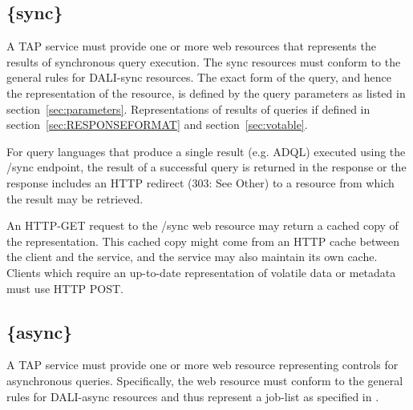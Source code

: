 \documentclass[11pt,letter]{ivoa}
\begin{document}
\subsection{\{sync\}}
\label{sec:tap-sync}

A TAP service must provide one or more web resources that represents the results 
of synchronous query execution. The {sync} resources must conform to the general rules for
DALI-sync \citep{std:DALI} resources. The exact form of the query, and hence the 
representation of the resource, is defined by the  query parameters as listed in 
section~\ref{sec:parameters}. Representations of results of queries if defined in 
section~\ref{sec:RESPONSEFORMAT} and section~\ref{sec:votable}.

For query languages that produce a single result (e.g. ADQL) executed using the 
/sync endpoint, the result of a successful query is returned in the response or 
the response includes an HTTP redirect (303: See Other) to a resource from 
which the result may be retrieved.

An HTTP-GET request to the /sync web resource may return a cached copy of the 
representation. This cached copy might come from an HTTP cache between the 
client and the service, and the service may also maintain its own cache. Clients 
which require an up-to-date representation of volatile data or metadata must use 
HTTP POST.

\subsection{\{async\}}
\label{sec:tap-async}

A TAP service must provide one or more web resource representing controls for 
asynchronous queries. Specifically, the web resource must conform to the general rules
for DALI-async \citep{std:DALI} resources and thus represent a job-list 
as specified in \citep{std:UWS}.
\end{document}
